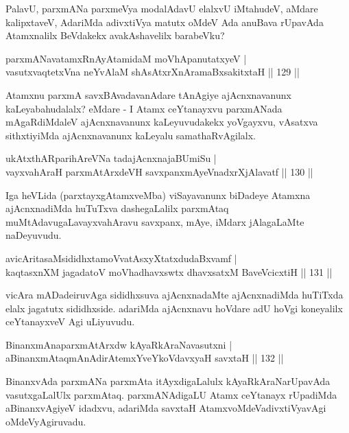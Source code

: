 \begin{artha}
PalavU, parxmANa parxmeVya modalAdavU elalxvU iMtahudeV, aMdare kalipxtaveV, AdariMda adivxtiVya matutx oMdeV Ada anuBava rUpavAda Atamxnalilx BeVdakekx avakAshavelilx barabeVku?
\end{artha}

\begin{shl}
parxmANavatamxRnA\s \s yAtamidaM moVhApanutatxyeV |\\
vasutxvaqtetxVna neYvAlaM shAsAtxrXnAramaBxsakitxtaH \hfill || 129 ||
\end{shl}

\begin{artha}
Atamxnu parxmA savxBAvadavanAdare tAnAgiye ajAcnxnavanunx kaLeyabahudalalx? eMdare - I Atamx ceYtanayxvu parxmANada mAgaRdiMdaleV ajAcnxnavanunx kaLeyuvudakekx yoVgayxvu, vAsatxva sithxtiyiMda ajAcnxnavanunx kaLeyalu samathaRvAgilalx.
\end{artha}

\begin{shl}
ukAtxthARparihAreVNa tadajAcnxnajaBUmiSu |\\
vayxvahAraH parxmAtArxdeVH savxpanxmAyeVnadxrXjAlavatf \hfill || 130 ||
\end{shl}

\begin{artha}%
Iga heVLida (parxtayxgAtamxveMba) viSayavanunx biDadeye Atamxna ajAcnxnadiMda huTuTxva dashegaLalilx parxmAtaq muMtAdavugaLa\break vayxvahAravu savxpanx, mAye, iMdarx jAlagaLaMte naDeyuvudu.
\end{artha}

\begin{shl}
avicAritasaMsididhxtamoVvatAsxyXtatxdudaBxvamf |\\
kaqtasxnXM jagadatoV moVhadhavxswtx dhavxsatxM BaveVcicxtiH \hfill || 131 ||
\end{shl}

\begin{artha}
vicAra mADadeiruvAga sididhxsuva ajAcnxnadaMte ajAcnxnadiMda huTiTxda elalx jagatutx sididhxside. adariMda ajAcnxnavu hoVdare adU hoVgi koneyalilx ceYtanayxveV Agi uLiyuvudu.
\end{artha}

\begin{shl}
BinanxmAnaparxmAtArxdw kAyaRkAraNavasutxni |\\
aBinanxmAtaqmAnAdirAtemxYveYkoV\s davxyaH savxtaH \hfill || 132 ||
\end{shl}

\begin{artha}
BinanxvAda parxmANa parxmAta itAyxdigaLalulx kAyaRkAraNarUpavAda vasutxgaLalUlx parxmAtaq. parxmANAdigaLU Atamx ceYtanayx rUpadiMda aBinanxvAgiyeV idadxvu, adariMda savxtaH AtamxvoMdeV\break adivxtiVyavAgi oMdeVyAgiruvadu.
\end{artha}


